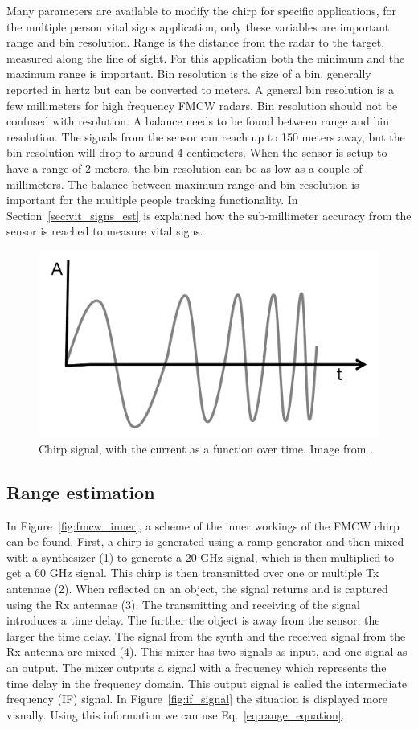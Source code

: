 Many parameters are available to modify the chirp for specific applications, for the multiple person vital signs application, only these variables are important: range and bin resolution. Range is the distance from the radar to the target, measured along the line of sight. For this application both the minimum and the maximum range is important. Bin resolution is the size of a bin, generally reported in hertz but can be converted to meters. A general bin resolution is a few millimeters for high frequency FMCW radars. Bin resolution should not be confused with resolution. A balance needs to be found between range and bin resolution. The signals from the sensor can reach up to 150 meters away, but the bin resolution will drop to around 4 centimeters. When the sensor is setup to have a range of 2 meters, the bin resolution can be as low as a couple of millimeters. The balance between maximum range and bin resolution is important for the multiple people tracking functionality. In Section~\ref{sec:vit_signs_est} is explained how the sub-millimeter accuracy from the sensor is reached to measure vital signs.

\begin{figure}[t]
\centering
\includegraphics[width=.5\textwidth]{figures/background/chirp.png}
\caption{Chirp signal, with the current as a function over time. Image from \cite{mmwave_fundamentals_website}.}
\label{fig:chirp}
\end{figure}

\subsection{Range estimation}
\label{sec:range_estimation_background}
In Figure~\ref{fig:fmcw_inner}, a scheme of the inner workings of the FMCW chirp can be found. First, a chirp is generated using a ramp generator and then mixed with a synthesizer (1) to generate a 20 GHz signal, which is then multiplied to get a 60 GHz signal. This chirp is then transmitted over one or multiple Tx antennae (2). When reflected on an object, the signal returns and is captured using the Rx antennae (3). The transmitting and receiving of the signal introduces a time delay. The further the object is away from the sensor, the larger the time delay. The signal from the synth and the received signal from the Rx antenna are mixed (4). This mixer has two signals as input, and one signal as an output. The mixer outputs a signal with a frequency which represents the time delay in the frequency domain. This output signal is called the intermediate frequency (IF) signal. In Figure~\ref{fig:if_signal} the situation is displayed more visually. Using this information we can use Eq.~\ref{eq:range_equation}.

